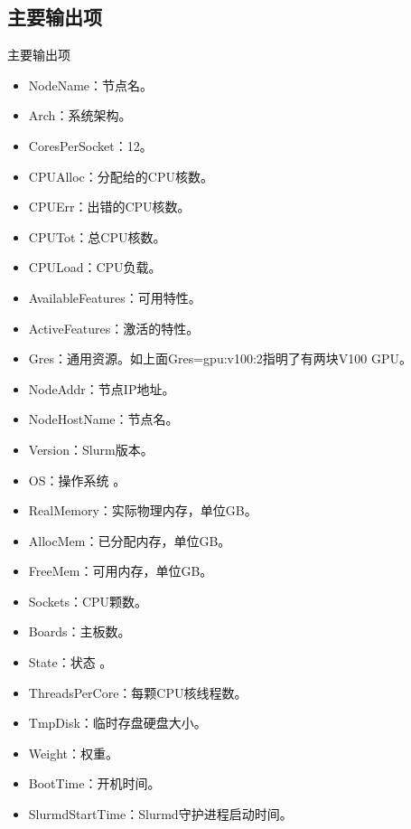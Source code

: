 \subsection{主要输出项}
\begin{frame}{主要输出项}
\begin{itemize}
	\item NodeName：节点名。
	\item Arch：系统架构。
	\item CoresPerSocket：12。
	\item CPUAlloc：分配给的CPU核数。
	\item CPUErr：出错的CPU核数。
	\item CPUTot：总CPU核数。
	\item CPULoad：CPU负载。
	\item AvailableFeatures：可用特性。
	\item ActiveFeatures：激活的特性。
	\item Gres：通用资源。如上面Gres=gpu:v100:2指明了有两块V100 GPU。
	\item NodeAddr：节点IP地址。
	\item NodeHostName：节点名。
	\item Version：Slurm版本。
	\item OS：操作系统 。
	\item RealMemory：实际物理内存，单位GB。
	\item AllocMem：已分配内存，单位GB。
	\item FreeMem：可用内存，单位GB。
	\item Sockets：CPU颗数。
	\item Boards：主板数。
	\item State：状态 。
	\item ThreadsPerCore：每颗CPU核线程数。
	\item TmpDisk：临时存盘硬盘大小。
	\item Weight：权重。
	\item BootTime：开机时间。
	\item SlurmdStartTime：Slurmd守护进程启动时间。
\end{itemize}

\end{frame}
